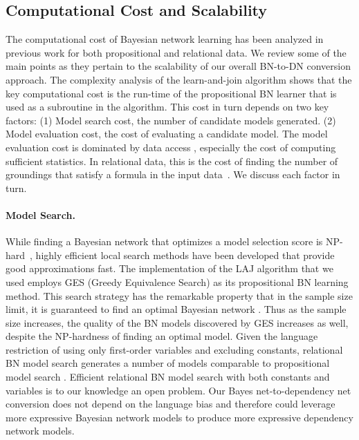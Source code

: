 \documentclass[runningheads,a4paper]{llncs}
\begin{document}
\subsection{Computational Cost and Scalability} The computational cost of Bayesian network learning has been analyzed in previous work for both propositional and relational data. We review some of the main points as they pertain to the scalability of our overall BN-to-DN conversion approach.
The complexity analysis of the learn-and-join algorithm \cite{Schulte2012} shows that the key computational cost is the run-time of the propositional BN learner that is used as a subroutine in the algorithm. This cost in turn depends on two key factors: (1) Model search cost, the number of candidate models generated. (2) Model evaluation cost, the cost of evaluating a candidate model. The model evaluation cost is dominated by data access \cite{Moore1998}, especially the cost of computing sufficient statistics. In relational data, this is the cost of finding the number of groundings that satisfy a formula in the input data~\cite{Friedman99prm,Domingos2009,Schulte2011}. We discuss each factor in turn. 

\paragraph{Model Search.}
While finding a Bayesian network that optimizes a model selection score is NP-hard~\cite{Chickering2004}, highly efficient local search methods have been developed that provide good approximations fast. The implementation of the LAJ algorithm that we used employs GES (Greedy Equivalence Search) as its propositional BN learning method. This search strategy has the remarkable property that in the sample size limit, it is guaranteed to find an optimal Bayesian network \cite{Chickering2002}. Thus as the sample size increases, the quality of the BN models discovered by GES increases as well, despite the NP-hardness of finding an optimal model. Given the language restriction of using only first-order variables and excluding constants, relational BN model search generates a number of models comparable to propositional model search \cite{Schulte2012}. Efficient relational BN model search with both constants and variables is to our knowledge an open problem. Our Bayes net-to-dependency net conversion does not depend on the language bias and therefore could leverage more expressive Bayesian network models to produce more expressive dependency network models.
\end{document}
